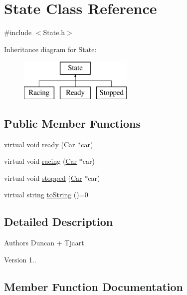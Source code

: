 \hypertarget{class_state}{}\section{State Class Reference}
\label{class_state}


{\ttfamily \#include $<$State.\+h$>$}

Inheritance diagram for State\+:\begin{figure}[H]
\begin{center}
\leavevmode
\includegraphics[height=2.000000cm]{class_state}
\end{center}
\end{figure}
\subsection*{Public Member Functions}
\begin{DoxyCompactItemize}
\item 
virtual void \mbox{\hyperlink{class_state_a3dbe765648d6f194e48f9371b0bddbed}{ready}} (\mbox{\hyperlink{class_car}{Car}} $\ast$car)
\item 
virtual void \mbox{\hyperlink{class_state_ad512c7492a0d1e78f5df2ac64a930915}{racing}} (\mbox{\hyperlink{class_car}{Car}} $\ast$car)
\item 
virtual void \mbox{\hyperlink{class_state_ae09018d67a94ff52d48fbbf62e5e0a76}{stopped}} (\mbox{\hyperlink{class_car}{Car}} $\ast$car)
\item 
virtual string \mbox{\hyperlink{class_state_afabc279037b4526ec161e6f8988855a9}{to\+String}} ()=0
\end{DoxyCompactItemize}


\subsection{Detailed Description}
\begin{DoxyAuthor}{Authors}
Duncan + Tjaart 
\end{DoxyAuthor}
\begin{DoxyVersion}{Version}
1.. 
\end{DoxyVersion}


\subsection{Member Function Documentation}
\mbox{\label{class_state_ad512c7492a0d1e78f5df2ac64a930915}} 
